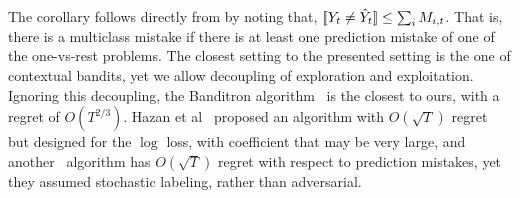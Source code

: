 The corollary follows directly from  by noting that, $[\![{Y_t \neq \hat{Y}_t}]\!] \leq \sum_i M_{i,t}$. That is, there is a multiclass mistake if there is at least one prediction mistake of one of the one-vs-rest problems. The closest setting  to the presented setting is the one of contextual bandits, yet we allow decoupling of exploration and exploitation. Ignoring this decoupling, the Banditron algorithm~\cite{kakade2008efficient} is the closest to ours, with a regret of $O(T^{2/3})$. Hazan et al~\cite{hazan2011newtron} proposed an algorithm with $O(\sqrt{T})$ regret but designed for the $\log$ loss, with coefficient that may be very large, and another~\cite{DBLP:journals/ml/CrammerG13} algorithm has $O(\sqrt{T})$ regret with respect to prediction mistakes, yet they assumed stochastic labeling, rather than adversarial.



